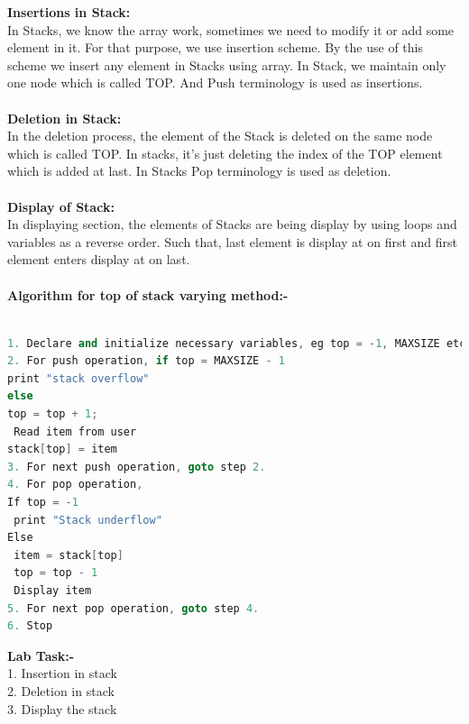 \documentclass[11pt]{article}            %
\begin{document}
\textbf{Insertions in Stack:}\\
In Stacks, we know the array work, sometimes we need to modify it or add some element in it. For
that purpose, we use insertion scheme. By the use of this scheme we insert any element in Stacks
using array. In Stack, we maintain only one node which is called TOP. And Push terminology is
used as insertions.\\~\\

\textbf{Deletion in Stack:}\\
In the deletion process, the element of the Stack is deleted on the same node which is called TOP.
In stacks, it’s just deleting the index of the TOP element which is added at last. In Stacks Pop
terminology is used as deletion.\\~\\

\textbf{Display of Stack:}\\
In displaying section, the elements of Stacks are being display by using loops and variables as a
reverse order. Such that, last element is display at on first and first element enters display at on
last.\\~\\


\textbf{Algorithm for top of stack varying method:-}\\~\\
\begin{lstlisting}[language=C++]
1. Declare and initialize necessary variables, eg top = -1, MAXSIZE etc.
2. For push operation, if top = MAXSIZE - 1
print "stack overflow"
else
top = top + 1;
 Read item from user
stack[top] = item
3. For next push operation, goto step 2.
4. For pop operation,
If top = -1
 print "Stack underflow"
Else
 item = stack[top]
 top = top - 1
 Display item
5. For next pop operation, goto step 4.
6. Stop
\end{lstlisting}

\textbf{Lab Task:-}\\
1. Insertion in stack\\
2. Deletion in stack\\
3. Display the stack\\~\\
\end{document}
